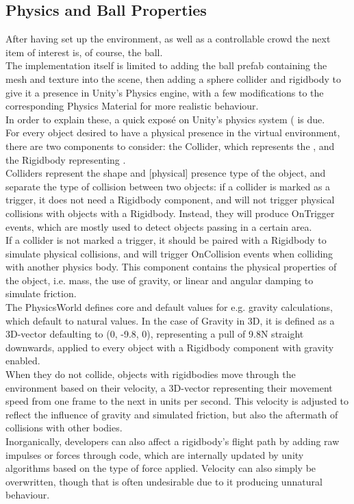 \subsection{Physics and Ball Properties}

After having set up the environment, as well as a controllable crowd the next item of interest is, of course, the ball.\\

The implementation itself is limited to adding the ball prefab containing the mesh and texture into the scene, then adding a sphere collider and rigidbody to give it a presence in Unity's Physics engine, with a few modifications to the corresponding Physics Material for more realistic behaviour.\\

In order to explain these, a quick exposé on Unity's physics system (\cite{unity-physics} is due.\\

For every object desired to have a physical presence in the virtual environment, there are two components to consider: the Collider, which represents the , and the Rigidbody representing .\\
Colliders represent the shape and [physical] presence type of the object, and separate the type of collision between two objects: if a collider is marked as a trigger, it does not need a Rigidbody component, and will not trigger physical collisions with objects with a Rigidbody. Instead, they will produce OnTrigger events, which are mostly used to detect objects passing in a certain area.\\
If a collider is not marked a trigger, it should be paired with a Rigidbody to simulate physical collisions, and will trigger OnCollision events when colliding with another physics body. This component contains the physical properties of the object, i.e. mass, the use of gravity, or linear and angular damping to simulate friction.\\

The PhysicsWorld defines core and default values for e.g. gravity calculations, which default to natural values. In the case of Gravity in 3D, it is defined as a 3D-vector defaulting to (0, -9.8, 0), representing a pull of 9.8N straight downwards, applied to every object with a Rigidbody component with gravity enabled.\\

When they do not collide, objects with rigidbodies move through the environment based on their velocity, a 3D-vector representing their movement speed from one frame to the next in units per second. This velocity is adjusted to reflect the influence of gravity and simulated friction, but also the aftermath of collisions with other bodies.\\
Inorganically, developers can also affect a rigidbody's flight path by adding raw impulses or forces through code, which are internally updated by unity algorithms based on the type of force applied. Velocity can also simply be overwritten, though that is often undesirable due to it producing unnatural behaviour.\\


